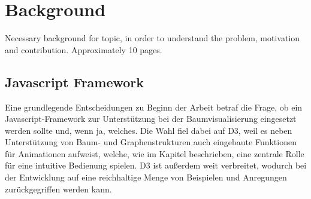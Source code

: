 \chapter{Background}
Necessary background for topic, in order to understand the problem, motivation and contribution. Approximately 10 pages.

\section{Javascript Framework}
Eine grundlegende Entscheidungen zu Beginn der Arbeit betraf die Frage, ob ein Javascript-Framework zur Unterstützung bei der Baumvisualisierung eingesetzt werden sollte und, wenn ja, welches. Die Wahl fiel dabei auf D3, weil es neben Unterstützung von Baum- und Graphenstrukturen auch eingebaute Funktionen für Animationen aufweist, welche, wie im Kapitel  beschrieben, eine zentrale Rolle für eine intuitive Bedienung spielen. D3 ist außerdem weit verbreitet, wodurch bei der Entwicklung auf eine reichhaltige Menge von Beispielen und Anregungen zurückgegriffen werden kann.